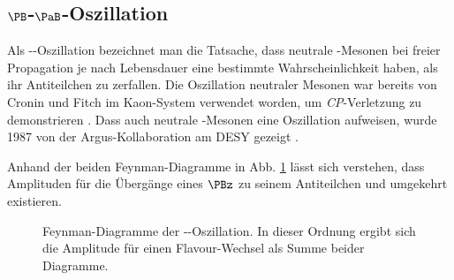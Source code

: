 \subsection{$\PB$-$\PaB$-Oszillation}

Als \PB-\PaB-Oszillation bezeichnet man die Tatsache, dass neutrale \PB-Mesonen bei freier Propagation je nach Lebensdauer eine bestimmte Wahrscheinlichkeit haben, als ihr Antiteilchen zu zerfallen.
Die Oszillation neutraler Mesonen war bereits von Cronin und Fitch im Kaon-System verwendet worden, um \textit{CP}-Verletzung zu demonstrieren \cite{kaons-cronin-fitch}.
Dass auch neutrale \PB-Mesonen eine Oszillation aufweisen, wurde 1987 von der Argus-Kollaboration am DESY gezeigt \cite{argus-bbar}.

Anhand der beiden Feynman-Diagramme in Abb. \ref{bbar-oscillation} lässt sich verstehen, dass Amplituden für die Übergänge eines $\PBz$ zu seinem Antiteilchen und umgekehrt existieren.

\begin{figure}
  \hspace{1cm}
  \caption{Feynman-Diagramme der \PBz-\PaBz-Oszillation.
  In dieser Ordnung ergibt sich die Amplitude für einen Flavour-Wechsel als Summe beider Diagramme.}
  \label{bbar-oscillation}
\end{figure}

